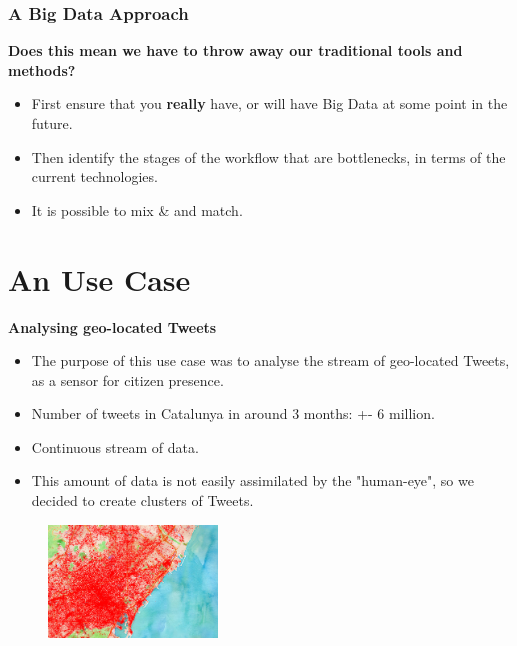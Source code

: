 \documentclass[hyperref={pdfpagelabels=true}]{beamer}
\begin{document}
\begin{frame}
\frametitle{A Big Data Approach}

\textbf{Does this mean we have to throw away our traditional tools and methods?}

    \begin{itemize}    
      \item<2->First ensure that you \textbf{really} have, or will have Big Data at some point in the future.%
      \item<3->Then identify the stages of the workflow that are bottlenecks, in terms of the current technologies.%
      \item<4->It is possible to mix \& and match.%
      \end{itemize}
\end{frame}


\section{An Use Case}
\begin{frame}
\textbf{Analysing geo-located Tweets}
    \begin{itemize}    
      \item<2->The purpose of this use case was to analyse the stream of geo-located Tweets, as a sensor for citizen presence.
      \item<3->Number of tweets in Catalunya in around 3 months: +- 6 million.
      \item<4->Continuous stream of data.%
      \item<5->This amount of data is not easily assimilated by the "human-eye", so we decided to create clusters of Tweets.
     \end{itemize}
      \begin{figure}   
      \includegraphics[width=0.4\textwidth]{bigdata1.png}   
     \end{figure}       
\end{frame}
\end{document}
